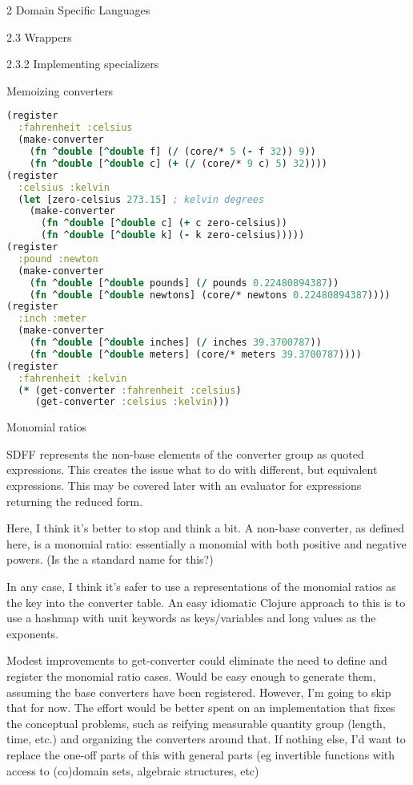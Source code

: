 \documentclass[12pt]{PalisadesLakesBook}
\begin{document}
\begin{plSection}{2 Domain Specific Languages}
\begin{plSection}{2.3 Wrappers}
\begin{plSection}{2.3.2 Implementing specializers}
\begin{plSection}{Memoizing converters}
\begin{plListing}
\begin{lstlisting}[language=clojure]
(register 
  :fahrenheit :celsius 
  (make-converter 
    (fn ^double [^double f] (/ (core/* 5 (- f 32)) 9))
    (fn ^double [^double c] (+ (/ (core/* 9 c) 5) 32))))
(register 
  :celsius :kelvin
  (let [zero-celsius 273.15] ; kelvin degrees
    (make-converter 
      (fn ^double [^double c] (+ c zero-celsius))
      (fn ^double [^double k] (- k zero-celsius)))))
(register
  :pound :newton
  (make-converter 
    (fn ^double [^double pounds] (/ pounds 0.22480894387))
    (fn ^double [^double newtons] (core/* newtons 0.22480894387))))
(register
  :inch :meter
  (make-converter 
    (fn ^double [^double inches] (/ inches 39.3700787))
    (fn ^double [^double meters] (core/* meters 39.3700787))))
(register
  :fahrenheit :kelvin 
  (* (get-converter :fahrenheit :celsius) 
     (get-converter :celsius :kelvin)))
\end{lstlisting}
\end{plListing}
\end{plSection}%
\begin{plSection}{Monomial ratios}

SDFF represents the non-base elements of the converter group
as quoted expressions. This creates the issue what to do with
different, but equivalent expressions. This may be covered 
later with an evaluator for expressions returning the reduced
form.
 
Here, I think it's better to stop and think a bit.
A non-base converter, as defined here, is a monomial ratio:
essentially a monomial
with both positive and negative powers.
(Is the a standard name for this?)

In any case, I think it's safer to use a representations
of the monomial ratios as the key into the converter table.
An easy idiomatic Clojure approach to this is to use a hashmap
with unit keywords as keys/variables and 
long values as the exponents. 

Modest improvements to {\clojureFont get-converter}
 could eliminate the need
to define and register the monomial ratio cases.
Would be easy enough to generate them, assuming the base
converters have been registered. 
However, I'm going to skip that for now.
The effort would be better spent on an implementation
that fixes the conceptual problems, such as reifying
measurable quantity group (length, time, etc.)
and organizing the converters around that.
If nothing else, I'd want to replace the one-off parts
of this with general parts (eg invertible functions
with access to (co)domain sets, algebraic structures, etc)


\end{plSection}
\end{plSection}
\end{plSection}
\end{plSection}
\end{document}

